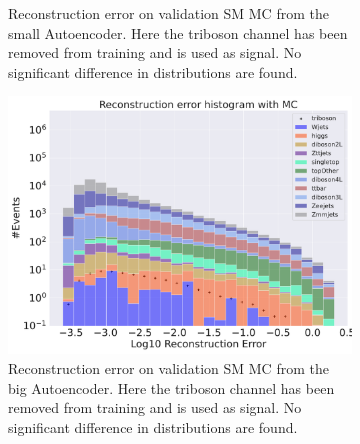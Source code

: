 \begin{figure}[h!]
\begin{subfigure}{.45\textwidth}
        \caption{Reconstruction error on validation SM MC from the small Autoencoder. Here the triboson channel has been removed from training and 
        is used as signal. No significant difference in distributions are found. }
        \label{fig:ae_small_triboson}
    \end{subfigure}
    \hfill 
    \begin{subfigure}{.45\textwidth}
        \includegraphics[width=\textwidth]{Figures/AE_testing/big/b_data_recon_big_rm3_feats_sig_triboson.pdf}
        \caption{Reconstruction error on validation SM MC from the big Autoencoder. Here the triboson channel has been removed from training and 
        is used as signal. No significant difference in distributions are found. }
        \label{fig:ae_big_triboson}
    \end{subfigure}
    \hfill  
    \caption{ }
    \label{fig:ae_big_channel4}
\end{figure}

